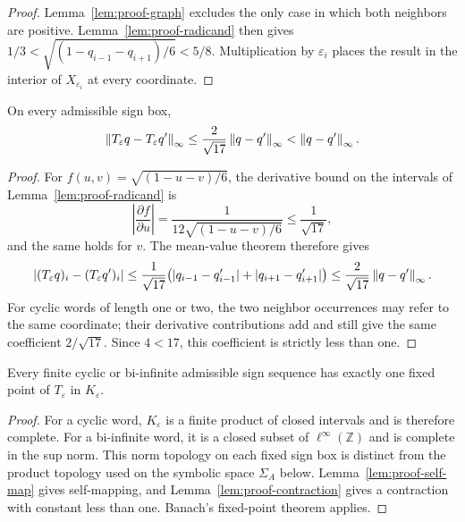 \begin{proof}
Lemma~\ref{lem:proof-graph} excludes the only case in which both neighbors
are positive.  Lemma~\ref{lem:proof-radicand} then gives
$1/3<\sqrt{(1-q_{i-1}-q_{i+1})/6}<5/8$.  Multiplication by
$\varepsilon_i$ places the result in the interior of $X_{\varepsilon_i}$ at
every coordinate.
\end{proof}

\begin{lemma}
\label{lem:proof-contraction}
On every admissible sign box,
\[
 \left\lVert T_\varepsilon q-T_\varepsilon q'\right\rVert_\infty
 \leq \frac2{\sqrt{17}}\left\lVert q-q'\right\rVert_\infty
 <\left\lVert q-q'\right\rVert_\infty.
\]
\end{lemma}

\begin{proof}
For $f(u,v)=\sqrt{(1-u-v)/6}$, the derivative bound on the intervals of
Lemma~\ref{lem:proof-radicand} is
\[
 \left|\frac{\partial f}{\partial u}\right|
 =\frac1{12\sqrt{(1-u-v)/6}}
 \leq \frac1{\sqrt{17}},
\]
and the same holds for $v$.  The mean-value theorem therefore gives
\[
 |(T_\varepsilon q)_i-(T_\varepsilon q')_i|
 \leq \frac1{\sqrt{17}}
 \bigl(|q_{i-1}-q'_{i-1}|+|q_{i+1}-q'_{i+1}|\bigr)
 \leq \frac2{\sqrt{17}}\left\lVert q-q'\right\rVert_\infty.
\]
For cyclic words of length one or two, the two neighbor occurrences may refer
to the same coordinate; their derivative contributions add and still give the
same coefficient $2/\sqrt{17}$.  Since $4<17$, this coefficient is strictly
less than one.
\end{proof}

\begin{lemma}
\label{lem:proof-fixed}
Every finite cyclic or bi-infinite admissible sign sequence has exactly one
fixed point of $T_\varepsilon$ in $K_\varepsilon$.
\end{lemma}

\begin{proof}
For a cyclic word, $K_\varepsilon$ is a finite product of closed intervals and
is therefore complete.  For a bi-infinite word, it is a closed subset of
$\ell^\infty(\mathbb Z)$ and is complete in the sup norm.  This norm topology
on each fixed sign box is distinct from the product topology used on the
symbolic space $\Sigma_A$ below.  Lemma~\ref{lem:proof-self-map} gives
self-mapping, and Lemma~\ref{lem:proof-contraction} gives a contraction with
constant less than one.  Banach's fixed-point theorem applies.
\end{proof}

